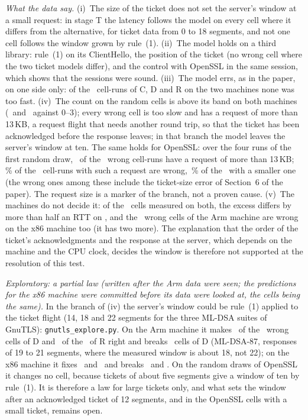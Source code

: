 \documentclass[9pt]{article}
\begin{document}
\emph{What the data say.} (i)~The size of the ticket does not set the server's window at a small request: in stage T the latency follows the model on every cell where it differs from the alternative, for ticket data from 0 to 18 segments, and not one cell follows the window grown by rule~(1). (ii)~The model holds on a third library: rule~(1) on its ClientHello, the position of the ticket (no wrong cell where the two ticket models differ), and the control with OpenSSL in the same session, which shows that the sessions were sound. (iii)~The model errs, as in the paper, on one side only: of the \GtlsFastCellRuns\ cell-runs of C, D and R on the two machines none was too fast. (iv)~The count on the random cells is above its band on both machines (\GtlsARWrong\ and \GtlsXRWrong\ against 0--3); every wrong cell is too slow and has a request of more than 13\,KB, a request flight that needs another round trip, so that the ticket has been acknowledged before the response leaves; in that branch the model leaves the server's window at ten. The same holds for OpenSSL: over the four runs of the first random draw, \DomLargeWrong\ of the \DomWrongTotal\ wrong cell-runs have a request of more than 13\,KB; \DomLargePct\,\% of the \DomLargeN\ cell-runs with such a request are wrong, \DomRestPct\,\% of the \DomRestN\ with a smaller one (the wrong ones among these include the ticket-size error of Section~6 of the paper). The request size is a marker of the branch, not a proven cause. (v)~The machines do not decide it: of the \GtlsBothCells\ cells measured on both, the excess differs by more than half an RTT on \GtlsBothDiffer, and the \GtlsSharedWrong\ wrong cells of the Arm machine are wrong on the x86 machine too (it has two more). The explanation that the order of the ticket's acknowledgments and the response at the server, which depends on the machine and the CPU clock, decides the window is therefore not supported at the resolution of this test.

\emph{Exploratory: a partial law (written after the Arm data were seen; the predictions for the x86 machine were committed before its data were looked at, the cells being the same).} In the branch of (iv) the server's window could be rule~(1) applied to the ticket flight (14, 18 and 22 segments for the three ML-DSA suites of GnuTLS): \texttt{gnutls\_explore.py}. On the Arm machine it makes \GtlsAHackDFixed\ of the \GtlsADWrong\ wrong cells of D and \GtlsAHackRFixed\ of the \GtlsARWrong\ of R right and breaks \GtlsAHackDBroke\ cells of D (ML-DSA-87, responses of 19 to 21 segments, where the measured window is about 18, not 22); on the x86 machine it fixes \GtlsXHackDFixed\ and \GtlsXHackRFixed\ and breaks \GtlsXHackDBroke\ and \GtlsXHackRBroke. On the random draws of OpenSSL it changes no cell, because tickets of about five segments give a window of ten by rule~(1). It is therefore a law for large tickets only, and what sets the window after an acknowledged ticket of 12 segments, and in the OpenSSL cells with a small ticket, remains open.
\end{document}
